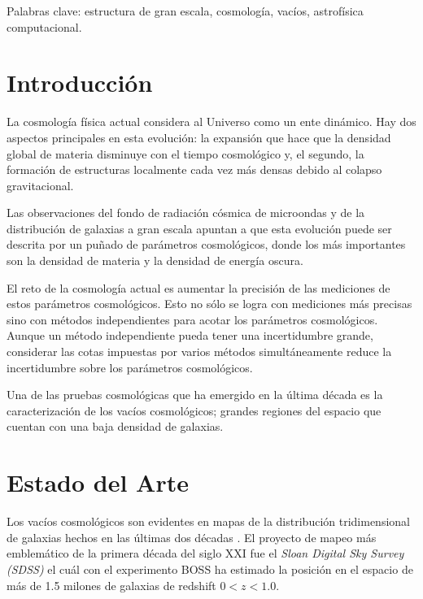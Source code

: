 \documentclass[preprint]{aastex62}
\begin{document}
  \medskip

  Palabras clave: estructura de gran escala, cosmología, vacíos,
  astrofísica computacional.


  \section{Introducción}

  La cosmolog\'ia f\'isica actual considera al Universo como un ente
  dinámico.  
  Hay dos aspectos principales en esta evoluci\'on: la expansi\'on que
  hace que la densidad global de materia disminuye
  con el tiempo cosmol\'ogico y, el segundo, la formaci\'on de
  estructuras localmente cada vez m\'as densas debido al colapso
  gravitacional. 

  Las observaciones del fondo de radiaci\'on c\'osmica de microondas
  \citep{WMAP2013} y de la distribuci\'on de galaxias a gran escala
  \citep{SDSS-DR14-2017} apuntan a que esta evoluci\'on puede ser descrita
  por un pu\~nado de par\'ametros cosmol\'ogicos, donde los m\'as
  importantes son la densidad de materia y la densidad de energ\'ia
  oscura. 
  
  El reto de la cosmolog\'ia actual
  es aumentar la precisi\'on de las
  mediciones de estos par\'ametros cosmol\'ogicos. 
  Esto no s\'olo se logra con mediciones m\'as precisas sino con
  m\'etodos independientes para acotar los par\'ametros
  cosmol\'ogicos.
  Aunque un m\'etodo independiente pueda tener una incertidumbre
  grande, considerar las cotas impuestas por varios m\'etodos
  simult\'aneamente reduce la incertidumbre sobre los par\'ametros
  cosmol\'ogicos.

  Una de las pruebas cosmol\'ogicas que ha emergido en la \'ultima
  d\'ecada es la caracterizaci\'on de los vac\'ios cosmol\'ogicos;
  grandes regiones del espacio que cuentan con una baja densidad de
  galaxias. 


  

  \section{Estado del Arte}

Los vac\'ios cosmol\'ogicos son evidentes en mapas de la
distribuci\'on tridimensional de galaxias hechos en las \'ultimas dos
d\'ecadas \citep{SDSS-DR14-2017}.
El proyecto de mapeo más emblem\'atico de la primera década del
siglo XXI fue el \textit{Sloan Digital Sky Survey (SDSS)} el cu\'al
con el experimento BOSS ha estimado la posici\'on en el espacio de
más de 1.5 milones de galaxias de redshift $0<z<1.0$.
\end{document}
